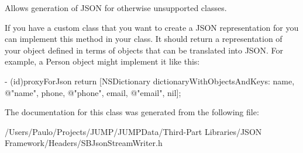 Allows generation of JSON for otherwise unsupported classes. 

If you have a custom class that you want to create a JSON representation for you can implement this method in your class. It should return a representation of your object defined in terms of objects that can be translated into JSON. For example, a Person object might implement it like this:


\begin{DoxyCode}
 - (id)proxyForJson {
        return [NSDictionary dictionaryWithObjectsAndKeys:
        name, @"name",
        phone, @"phone",
        email, @"email",
        nil];
 }
\end{DoxyCode}
 

The documentation for this class was generated from the following file:\begin{DoxyCompactItemize}
\item 
/Users/Paulo/Projects/JUMP/JUMPData/Third-\/Part Libraries/JSON Framework/Headers/SBJsonStreamWriter.h\end{DoxyCompactItemize}
